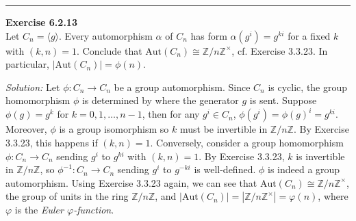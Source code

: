 \documentclass[a4paper, 12pt]{article}
\newenvironment{problem}[2][Exercise]
    { \begin{mdframed}[backgroundcolor=gray!20] \textbf{#1 #2} \\}
    {  \end{mdframed}}
\newenvironment{solution}
    {\textit{Solution:}}
    {}
\begin{document}
\noindent\rule{7in}{2.8pt}
\begin{problem}{6.2.13}
Let \(C_n=\langle g\rangle\). Every automorphism \(\alpha\) of \(C_n\) has form \(\alpha(g^i)=g^{ki}\) for a fixed \(k\) with \((k,n)=1\). Conclude that \(\text{Aut}(C_n)\cong \mathbb{Z}/n \mathbb{Z}^\times\), 
cf. Exercise 3.3.23. In particular, \(|\text{Aut}(C_n)|=\phi(n)\). 
\end{problem}
\begin{solution}
Let \(\phi:C_n\rightarrow C_n\) be a group automorphism. Since \(C_n\) is cyclic, the group homomorphism \(\phi\) is determined by where the generator \(g\) is sent. Suppose \(\phi(g)=g^k\) for \(k=0,1,\ldots,n-1\), then for any \(g^i\in C_n\), \(\phi(g^i)=\phi(g)^i=g^{ki}\). Moreover, \(\phi\) is a group isomorphism so \(k\) 
must be invertible in \(\mathbb{Z}/ n \mathbb{Z}\). By Exercise 3.3.23, this happens if \((k,n)=1\). Conversely, consider a group homomorphism \(\phi:C_n\rightarrow C_n\) sending \(g^i\) to \(g^{ki}\) with \((k,n)=1\). By Exercise 3.3.23, \(k\) is invertible in \(\mathbb{Z}/n \mathbb{Z}\), so \(\phi^{-1}:C_n\rightarrow C_n\) 
sending \(g^i\) to \(g^{-ki}\) is well-defined. \(\phi\) is indeed a group automorphism. Using Exercise 3.3.23 again, we can see that \(\text{Aut}(C_n)\cong \mathbb{Z}/ n \mathbb{Z}^\times\), the group of units in the ring \(\mathbb{Z}/ n \mathbb{Z}\), and 
\(|\text{Aut}(C_n)|=|\mathbb{Z}/ n \mathbb{Z}^\times|=\varphi(n)\), where \(\varphi\) is the \textit{Euler \(\varphi\)-function}.
\end{solution}
\end{document}
